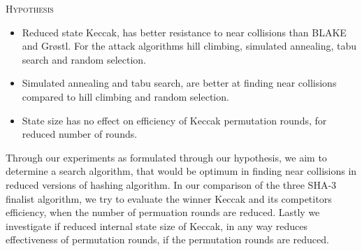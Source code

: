 \begin{center}
  \framebox
  {
    \parbox{400pt}
    {
      \centering \textsc{Hypothesis} \\
      \begin{itemize}
      \item Reduced state Keccak, has better resistance to near collisions than BLAKE and Gr{\o}stl. For the
      attack algorithms hill climbing, simulated annealing, tabu search and random selection.
      \item Simulated annealing and tabu search, are better at finding near collisions compared to hill 
      climbing and random selection.
      \item State size has no effect on efficiency of Keccak permutation rounds, for reduced number of rounds.
      \end{itemize}
    }
  }
\end{center}

Through our experiments as formulated through our hypothesis, we aim to determine a search algorithm, that
would be optimum in finding near collisions in reduced versions of hashing algorithm. In our comparison of
the three SHA-3 finalist algorithm, we try to evaluate the winner Keccak and its competitors efficiency, when
the number of permuation rounds are reduced. Lastly we investigate if reduced internal state size of Keccak,
in any way reduces effectiveness of permutation rounds, if the permutation rounds are reduced.
